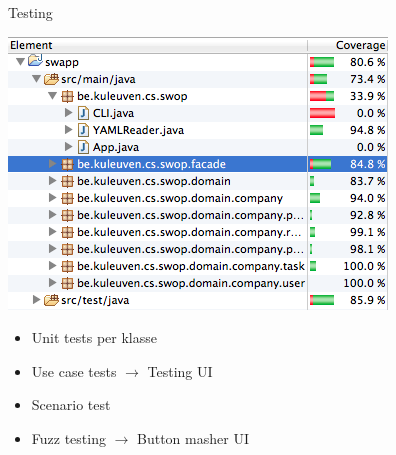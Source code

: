 \documentclass[mathserif,serif]{beamer}
\begin{document}
  \begin{frame}{Testing}
      \begin{center}
      \includegraphics[width=\textwidth,height=0.6\textheight,keepaspectratio]{code_coverage.png}
        \begin{itemize}
        \item Unit tests per klasse
        \item Use case tests $\rightarrow$ Testing UI
        \item Scenario test
        \item Fuzz testing $\rightarrow$ Button masher UI
        \end{itemize}
      \end{center}
  \end{frame}

\end{document}
